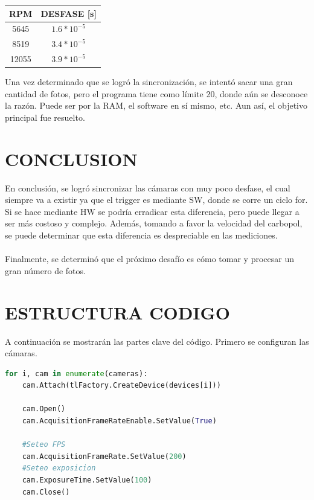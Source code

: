 \documentclass{article}
\begin{document}
\begin{center}
    \begin{tabular}{|c|c|}
    \hline
    RPM & DESFASE [s] \\
    \hline
    5645 & $1.6*10^{-5}$ \\
    \hline
    8519 & $3.4*10^{-5}$ \\
    \hline
    12055 & $3.9*10^{-5}$ \\
    \hline
    \end{tabular}
\end{center}

\noindent Una vez determinado que se logró la sincronización, se intentó sacar una gran cantidad de fotos, pero el programa tiene como límite 20, donde aún se desconoce la razón. Puede ser por la RAM, el software en sí mismo, etc. Aun así, el objetivo principal fue resuelto.

\section{CONCLUSION}
\noindent En conclusión, se logró sincronizar las cámaras con muy poco desfase, el cual siempre va a existir ya que el trigger es mediante SW, donde se corre un ciclo for. Si se hace mediante HW se podría erradicar esta diferencia, pero puede llegar a ser más costoso y complejo. Además, tomando a favor la velocidad del carbopol, se puede determinar que esta diferencia es despreciable en las mediciones.
\\ \\
Finalmente, se determinó que el próximo desafío es cómo tomar y procesar un gran número de fotos.

\newpage
\section{ESTRUCTURA CODIGO}

\noindent A continuación se mostrarán las partes clave del código. Primero se configuran las cámaras.

\begin{lstlisting}[language=Python]
  for i, cam in enumerate(cameras):
    cam.Attach(tlFactory.CreateDevice(devices[i]))

    cam.Open()
    cam.AcquisitionFrameRateEnable.SetValue(True)

    #Seteo FPS
    cam.AcquisitionFrameRate.SetValue(200)
    #Seteo exposicion
    cam.ExposureTime.SetValue(100) 
    cam.Close()
\end{lstlisting}
\end{document}
